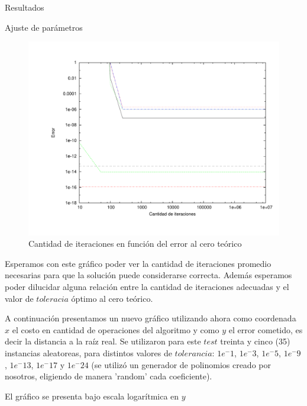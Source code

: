 \begin{section}{Resultados}
\begin{subsection}{Ajuste de parámetros}
		\begin{figure}[H]
		  \centering
			\includegraphics[width=14cm]{graficos/iter_graf.pdf}
		  \caption{Cantidad de iteraciones en función del error al cero teórico}
		  \label{fig:iter}
		\end{figure}

		Esperamos con este gráfico poder ver la cantidad de iteraciones promedio necesarias para que la solución puede considerarse correcta. Además esperamos poder dilucidar alguna relación entre la cantidad de iteraciones adecuadas y el valor de $toleracia$ óptimo al cero teórico.
		
		A continuación presentamos un nuevo gráfico utilizando ahora como coordenada $x$ el costo en cantidad de operaciones del algoritmo y como $y$ el error cometido, es decir la distancia a la raíz real. Se utilizaron para este $test$ treinta y cinco (35) instancias aleatoreas, para distintos valores de $tolerancia$: $1e^-1$, $1e^-3$, $1e^-5$, $1e^-9$, $1e^-13$, $1e^-17$ y $1e^-24$ (se utilizó un generador de polinomios creado por nosotros, eligiendo de manera 'random' cada coeficiente).
		
		El gráfico se presenta bajo escala logarítmica en $y$\\


\end{subsection}
\end{section}

